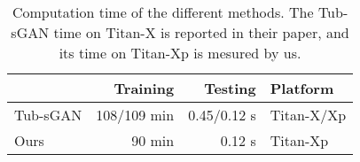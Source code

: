 \documentclass[letterpaper]{article} %
\begin{document}
	\begin{table}[h!]
		\begin{center}
		\begin{tabularx}{\columnwidth}{XrrX}
			\hline
			 & Training & Testing & Platform \\ \hline
			Tub-sGAN & 108/109 min & 0.45/0.12 s & Titan-X/Xp \\ 
			Ours & 90 min & 0.12 s & Titan-Xp \\ \hline
		\end{tabularx}
		\end{center}
		\caption{Computation time of the different methods. The Tub-sGAN time on Titan-X is reported in their paper, and its time on Titan-Xp is mesured by us.}
		\label{tab:computation_time}
	\end{table}
		

    
    
	
	

	
\end{document}
